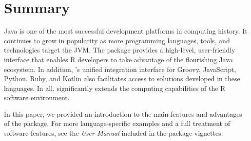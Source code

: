 \section{Summary}

Java is one of the most successful development platforms in computing history. It continues to grow in popularity as more programming languages, tools, and technologies target the JVM. The  package provides a high-level, user-friendly interface that enables R developers to take advantage of the flourishing Java ecosystem. In addition, 's unified integration interface for Groovy, JavaScript, Python, Ruby, and Kotlin also facilitates access to solutions developed in these languages. In all,  significantly extends the computing capabilities of the R software environment.

In this paper, we provided an introduction to the main features and advantages of the  package. For more language-specific examples and a full treatment of software features, see the \textit{ User Manual} included in the package vignettes.



\address{Floid R. Gilbert\\
    Department of Statistics\\
    Brigham Young University\\
    Provo, UT 84602\\
    USA\\}

\address{David B. Dahl\\
    Department of Statistics\\
    Brigham Young University\\
    Provo, UT 84602\\
    USA\\}

